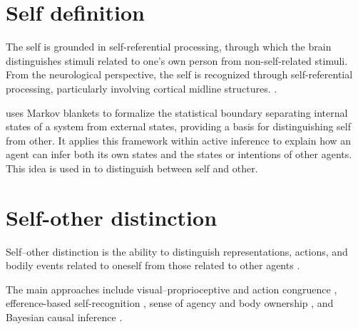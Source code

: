 \documentclass[a4paper]{article}
\title{}
\date{}
\author{Mohammad Rahmani}
\begin{document}
   \maketitle
   \section{Self definition}

      The self is grounded in self-referential processing, through which the brain distinguishes stimuli related to one's own person from non-self-related stimuli. From the neurological perspective, the self is recognized through self-referential processing, particularly involving cortical midline structures. \cite{northoff-2006-self-referential-processing-in-our-brain-a-meta-analysis-of-imaging-studies-on-the-self}.

      \cite{demekas-2020-an-investigation-of-the-free-energy-principle-for-emotion-recognition} uses Markov blankets to formalize the statistical boundary separating internal states of a system from external states, providing a basis for distinguishing self from other.
      It applies this framework within active inference to explain how an agent can infer both its own states and the states or intentions of other agents. This idea is used in \cite{friston-2013-life-as-we-know-it}
      to distinguish between self and other.

   \section{Self-other distinction}


      Self--other distinction is the ability to distinguish representations, actions, and bodily events related to oneself from those related to other agents \cite{decety-2003-shared-representations-between-self-and-other}.

      The main approaches include visual--proprioceptive and action congruence \cite{van-den-bos-2002-sense-of-body-and-sense-of-action-both-contribute-to-self-recognition}, efference-based self-recognition \cite{tsakiris-2005-a-specific-role-for-efferent-information-in-self-recognition}, sense of agency and body ownership \cite{kalckert-2012-moving-a-rubber-hand-that-feels-like-your-own}, and Bayesian causal inference \cite{samad-2015-perception-of-body-ownership-is-driven-by-bayesian-sensory-inference}.
\end{document}
